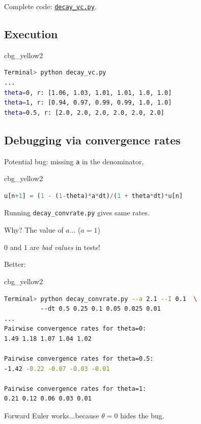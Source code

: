 \documentclass[%
oneside,                 %
final,                   %
10pt]{article}
\newenvironment{_cod_tight}[1]{
   \def\FrameCommand{\colorbox{#1}}
   \FrameRule0.6pt\MakeFramed {\FrameRestore}\vskip3mm}
   {\vskip0mm\endMakeFramed}
\newenvironment{cod}[1]{
\bgroup\rmfamily
\fboxsep=0mm\relax
\begin{_cod_tight}{#1}
\list{}{\parsep=-2mm\parskip=0mm\topsep=0pt\leftmargin=2mm
\rightmargin=2\leftmargin\leftmargin=4pt\relax}
\item\relax}
{\endlist\end{_cod_tight}\egroup}
\begin{document}
Complete code: \href{{http://tinyurl.com/ofkw6kc/genz/decay_vc.py}}{\nolinkurl{decay_vc.py}}.

\subsection*{Execution}

\begin{cod}{cbg_yellow2}\begin{lstlisting}[language=bash,style=simple,xleftmargin=2mm]
Terminal> python decay_vc.py
...
theta=0, r: [1.06, 1.03, 1.01, 1.01, 1.0, 1.0]
theta=1, r: [0.94, 0.97, 0.99, 0.99, 1.0, 1.0]
theta=0.5, r: [2.0, 2.0, 2.0, 2.0, 2.0, 2.0]
\end{lstlisting}\end{cod}
\noindent


\subsection*{Debugging via convergence rates}

Potential bug: missing \texttt{a} in the denominator,

\begin{cod}{cbg_yellow2}\begin{lstlisting}[language=Python,style=simple,xleftmargin=2mm]
u[n+1] = (1 - (1-theta)*a*dt)/(1 + theta*dt)*u[n]
\end{lstlisting}\end{cod}
\noindent
Running \Verb!decay_convrate.py! gives same rates.

Why? The value of $a$... ($a=1$)

0 and 1 are \emph{bad values} in tests!

Better:
\begin{cod}{cbg_yellow2}\begin{lstlisting}[language=bash,style=simple,xleftmargin=2mm]
Terminal> python decay_convrate.py --a 2.1 --I 0.1  \ 
          --dt 0.5 0.25 0.1 0.05 0.025 0.01
...
Pairwise convergence rates for theta=0:
1.49 1.18 1.07 1.04 1.02

Pairwise convergence rates for theta=0.5:
-1.42 -0.22 -0.07 -0.03 -0.01

Pairwise convergence rates for theta=1:
0.21 0.12 0.06 0.03 0.01
\end{lstlisting}\end{cod}
\noindent

Forward Euler works...because $\theta=0$ hides the bug.
\end{document}

